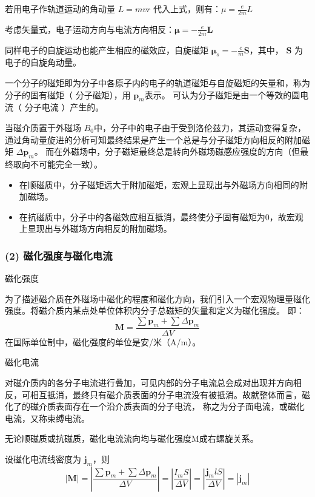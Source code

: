 若用电子作轨道运动的角动量 $L=mvr$ 代入上式，则有：$\displaystyle \mu=\frac{e}{2m}L$

考虑矢量式，电子运动方向与电流方向相反：$\boldsymbol{\mu}=\displaystyle -\frac{e}{2m}\boldsymbol{L}$

同样电子的自旋运动也能产生相应的磁效应，自旋磁矩 $\displaystyle \boldsymbol{\mu}_{s}=-\frac{e}{m}\boldsymbol{S}$，其中，
$\boldsymbol{S}$ 为电子的自旋角动量。

一个分子的磁矩即为分子中各原子内的电子的轨道磁矩与自旋磁矩的矢量和，称为分子的固有磁矩（ {\heiti 分子磁矩}），用 $\boldsymbol{p}_m$表示。
可认为分子磁矩是由一个等效的圆电流（ {\heiti 分子电流} ）产生的。

当磁介质置于外磁场 $B_0$中，分子中的电子由于受到洛伦兹力，其运动变得复杂，通过角动量旋进的分析可知最终结果是产生一个总是与分子磁矩方向相反的附加磁矩 $\Delta\boldsymbol{p}_m$。
而在外磁场中，分子磁矩最终总是转向外磁场磁感应强度的方向（但最终取向不可能完全一致）。
\begin{itemize}
  \item 在顺磁质中，分子磁矩远大于附加磁矩，宏观上显现出与外磁场方向相同的附加磁场。
  \item 在抗磁质中，分子中的各磁效应相互抵消，最终使分子固有磁矩为0，故宏观上显现出与外磁场方向相反的附加磁场。
\end{itemize}

\subsubsection{(2) 磁化强度与磁化电流}

{\heiti 磁化强度}

为了描述磁介质在外磁场中磁化的程度和磁化方向，我们引入一个宏观物理量磁化强度。将磁介质内某点处单位体积内分子总磁矩的矢量和定义为磁化强度。
即：
$$
\boldsymbol{M}=\frac{\sum \boldsymbol{p}_m+\sum\Delta \boldsymbol{p}_m}{\Delta V}
$$
在国际单位制中，磁化强度的单位是安/米（A/m）。

{\heiti 磁化电流}

对磁介质内的各分子电流进行叠加，可见内部的分子电流总会成对出现并方向相反，可相互抵消，最终只有磁介质表面的分子电流没有被抵消。故就整体而言，磁化了的磁介质表面存在一个沿介质表面的分子电流，
称之为{\heiti 分子面电流}，或{\heiti 磁化电流}，又称{\heiti 束缚电流}。

无论顺磁质或抗磁质，磁化电流流向均与磁化强度M成右螺旋关系。

设磁化电流线密度为 $\boldsymbol{j}_m$，则
$$
\left| \boldsymbol{M} \right| =\left| \frac{\sum \boldsymbol{p}_m+\sum \Delta \boldsymbol{p}_m}{\Delta V} \right| 
=\left| \frac{I_m S}{\Delta V}  \right| =\left| \frac{\boldsymbol{j}_m l S}{\Delta V}  \right| =\left| \boldsymbol{j}_m \right| 
$$

